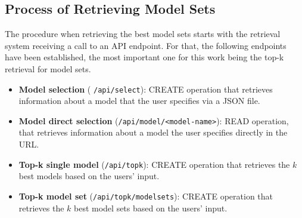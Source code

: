 \subsection{Process of Retrieving Model Sets}\label{processrs}

The procedure when retrieving the best model sets starts with the retrieval system receiving a call to an API endpoint. For that, the following endpoints have been established, the most important one for this work being the top-k retrieval for model sets.


\begin{itemize}

\item \textbf{Model selection} ( \texttt{/api/select}): CREATE operation that retrieves information about a model that the user specifies via a JSON file. 
\item \textbf{Model direct selection} (\texttt{/api/model/<model-name>}): READ operation, that retrieves information about a model the user specifies directly in the URL.
\item \textbf{Top-k single model} (\texttt{/api/topk}): CREATE operation that retrieves the $k$ best models based on the users' input.
\item \textbf{Top-k model set} (\texttt{/api/topk/modelsets}): CREATE operation that retrieves the $k$ best model sets based on the users' input.
\end{itemize}

